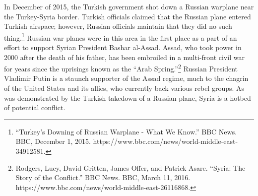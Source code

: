 \documentclass[10pt, letterpaper]{article}
\begin{document}
In December of 2015, the Turkish government shot down a Russian warplane
near the Turkey-Syria border. Turkish officials claimed that the Russian
plane entered Turkish airspace; however, Russian officials maintain that
they did no such thing.\footnote{``Turkey's Downing of Russian Warplane
  - What We Know.'' BBC News. BBC, December 1, 2015.
  https://www.bbc.com/news/world-middle-east-34912581.} Russian war
planes were in this area in the first place as a part of an effort to
support Syrian President Bashar al-Assad. Assad, who took power in 2000
after the death of his father, has been embroiled in a multi-front civil
war for years since the uprisings known as the ``Arab
Spring.''\footnote{Rodgers, Lucy, David Gritten, James Offer, and
  Patrick Asare. ``Syria: The Story of the Conflict.'' BBC News. BBC,
  March 11, 2016. https://www.bbc.com/news/world-middle-east-26116868.}
Russian President Vladimir Putin is a staunch supporter of the Assad
regime, much to the chagrin of the United States and its allies, who
currently back various rebel groups. As was demonstrated by the Turkish
takedown of a Russian plane, Syria is a hotbed of potential conflict. \\
\end{document}
